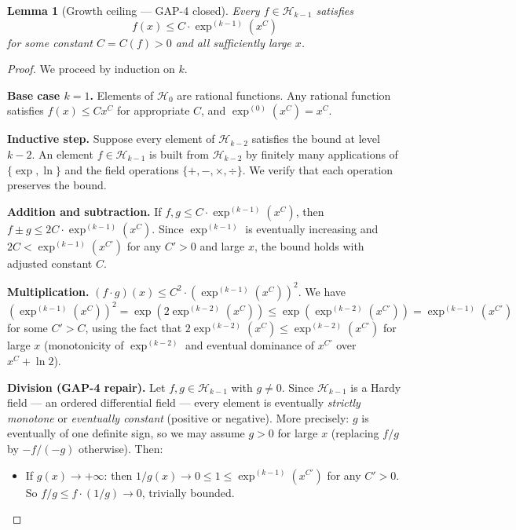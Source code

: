 \documentclass[12pt,a4paper]{article}
\newtheorem{lemma}[theorem]{Lemma}
\theoremstyle{definition}
\theoremstyle{remark}
\begin{document}
\begin{lemma}[Growth ceiling --- GAP-4 closed]\label{lem:growthcap-full}
Every $f \in \mathcal{H}_{k-1}$ satisfies
\[
  f(x) \leq C \cdot \exp^{(k-1)}(x^C)
\]
for some constant $C = C(f) > 0$ and all sufficiently large $x$.
\end{lemma}

\begin{proof}
We proceed by induction on $k$.

\medskip
\noindent\textbf{Base case $k = 1$.}
Elements of $\mathcal{H}_0$ are rational functions.  Any rational function satisfies
$f(x) \leq C x^C$ for appropriate $C$, and $\exp^{(0)}(x^C) = x^C$.

\medskip
\noindent\textbf{Inductive step.}
Suppose every element of $\mathcal{H}_{k-2}$ satisfies the bound at level $k-2$.
An element $f \in \mathcal{H}_{k-1}$ is built from $\mathcal{H}_{k-2}$ by finitely many
applications of $\{\exp, \ln\}$ and the field operations $\{+, -, \times, \div\}$.
We verify that each operation preserves the bound.

\medskip
\noindent\textbf{Addition and subtraction.}
If $f, g \leq C \cdot \exp^{(k-1)}(x^C)$, then
$f \pm g \leq 2C \cdot \exp^{(k-1)}(x^C)$.
Since $\exp^{(k-1)}$ is eventually increasing and $2C < \exp^{(k-1)}(x^{C'})$
for any $C' > 0$ and large $x$, the bound holds with adjusted constant $C$.

\medskip
\noindent\textbf{Multiplication.}
$(f \cdot g)(x) \leq C^2 \cdot (\exp^{(k-1)}(x^C))^2$.
We have $(\exp^{(k-1)}(x^C))^2 = \exp(2\exp^{(k-2)}(x^C))
\leq \exp(\exp^{(k-2)}(x^{C'})) = \exp^{(k-1)}(x^{C'})$
for some $C' > C$, using the fact that $2 \exp^{(k-2)}(x^C) \leq \exp^{(k-2)}(x^{C'})$
for large $x$ (monotonicity of $\exp^{(k-2)}$ and eventual dominance of $x^{C'}$
over $x^C + \ln 2$).

\medskip
\noindent\textbf{Division (GAP-4 repair).}
Let $f, g \in \mathcal{H}_{k-1}$ with $g \neq 0$.  Since $\mathcal{H}_{k-1}$ is a
Hardy field --- an ordered differential field --- every element is eventually
\emph{strictly monotone} or \emph{eventually constant} (positive or negative).
More precisely: $g$ is eventually of one definite sign, so we may assume $g > 0$
for large $x$ (replacing $f/g$ by $-f/(-g)$ otherwise).  Then:

\begin{itemize}
  \item If $g(x) \to +\infty$: then $1/g(x) \to 0 \leq 1 \leq \exp^{(k-1)}(x^{C'})$
        for any $C' > 0$.  So $f/g \leq f \cdot (1/g) \to 0$, trivially bounded.


\end{itemize}
\end{proof}
\end{document}

